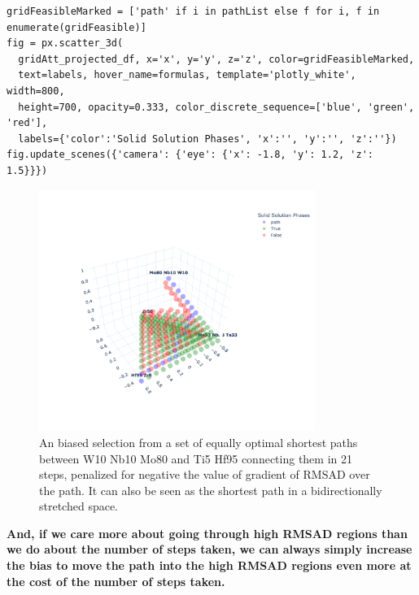 \begin{verbatim}
gridFeasibleMarked = ['path' if i in pathList else f for i, f in enumerate(gridFeasible)]
fig = px.scatter_3d(
  gridAtt_projected_df, x='x', y='y', z='z', color=gridFeasibleMarked, 
  text=labels, hover_name=formulas, template='plotly_white', width=800, 
  height=700, opacity=0.333, color_discrete_sequence=['blue', 'green', 'red'], 
  labels={'color':'Solid Solution Phases', 'x':'', 'y':'', 'z':''})
fig.update_scenes({'camera': {'eye': {'x': -1.8, 'y': 1.2, 'z': 1.5}}})
\end{verbatim}

\begin{figure}[H]
    \centering
    \includegraphics[width=0.8\textwidth]{nimplextutorial2/02.AdditiveManufacturingPathPlanning_71_1.pdf}
    \caption{An biased selection from a set of equally optimal shortest paths between W10 Nb10 Mo80 and Ti5 Hf95 connecting them in 21 steps, penalized for negative the value of gradient of RMSAD over the path. It can also be seen as the shortest path in a bidirectionally stretched space.}
    \label{nimplextutorial2:fig:highvalue}
\end{figure}


\textbf{And, if we care more about going through high RMSAD regions than
we do about the number of steps taken, we can always simply increase the
bias to move the path into the high RMSAD regions even more at the cost
of the number of steps taken.}


